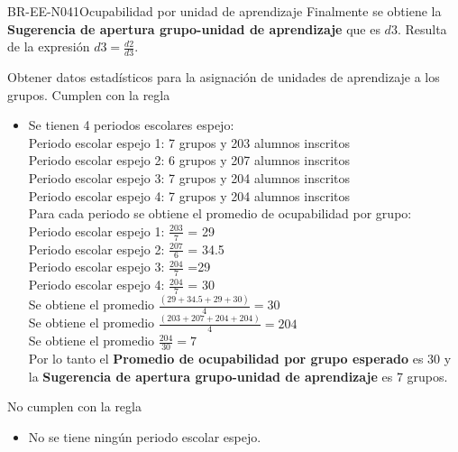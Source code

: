 \begin{BusinessRule}{BR-EE-N041}{Ocupabilidad por unidad de aprendizaje}
	Finalmente se obtiene la \textbf{Sugerencia de apertura grupo-unidad de aprendizaje} que es $d3$. Resulta de la expresión $d3 =  \frac{d2}{d3}$.

	\BRItem[Motivación] Obtener datos estadísticos para la asignación de unidades de aprendizaje a los grupos.
	 Cumplen con la regla
	\begin{itemize}
		\item Se tienen 4 periodos escolares espejo:\\
		Periodo escolar espejo 1: 7 grupos y 203 alumnos inscritos\\
		Periodo escolar espejo 2: 6 grupos y 207 alumnos inscritos\\
		Periodo escolar espejo 3: 7 grupos y 204 alumnos inscritos\\
		Periodo escolar espejo 4: 7 grupos y 204 alumnos inscritos\\
		Para cada periodo se obtiene el promedio de ocupabilidad por grupo:\\
		Periodo escolar espejo 1: $\frac{203}{7}$ = 29\\
		Periodo escolar espejo 2: $\frac{207}{6}$ = 34.5\\
		Periodo escolar espejo 3: $\frac{204}{7}$ =29\\
		Periodo escolar espejo 4: $\frac{204}{7}$ = 30\\
		Se obtiene el promedio $\frac{(29+34.5+29+30)}{4} = 30$\\
		Se obtiene el promedio $\frac{(203+207+204+204)}{4} = 204$\\
		Se obtiene el promedio $\frac{204}{30} = 7$\\
		Por lo tanto el \textbf{Promedio de ocupabilidad por grupo esperado} es 30 y la \textbf{Sugerencia de apertura grupo-unidad de aprendizaje} es 7 grupos.
	\end{itemize}
	 No cumplen con la regla
	\begin{itemize}
		\item No se tiene ningún periodo escolar espejo.
	\end{itemize}
\end{BusinessRule}

